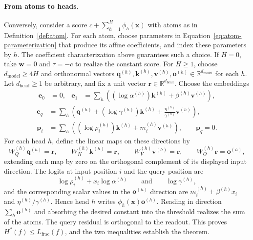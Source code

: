 \documentclass{article}
\theoremstyle{definition}
\theoremstyle{plain}
\newcommand{\hstar}{H^{\ast}}
\begin{document}
\paragraph{From atoms to heads.}
Conversely, consider a score $c+\sum_{h=1}^{H}\phi_h(\mathbf{x})$ with atoms as in Definition~\ref{def:atom}. For each atom, choose parameters in Equation~\eqref{eq:atom-parameterization} that produce its affine coefficients, and index these parameters by $h$. The coefficient characterization above guarantees such a choice. If $H=0$, take $\mathbf{w}=0$ and $\tau=-c$ to realize the constant score. For $H\geq1$, choose $d_{\mathrm{model}}\geq4H$ and orthonormal vectors $\mathbf{q}^{(h)},\mathbf{k}^{(h)},\mathbf{v}^{(h)},\mathbf{o}^{(h)}\in\mathbb{R}^{d_{\mathrm{model}}}$ for each $h$. Let $d_{\mathrm{head}}\geq1$ be arbitrary, and fix a unit vector $\mathbf{r}\in\mathbb{R}^{d_{\mathrm{head}}}$. Choose the embeddings
\begin{align}
\mathbf{e}_0&=0,
&
\mathbf{e}_1&=\sum_h\left((\log\alpha^{(h)})\mathbf{k}^{(h)}
+\beta^{(h)}\mathbf{v}^{(h)}\right),
\label{eq:normal-token-embeddings}
\end{align}
\begin{equation}
\begin{aligned}
\mathbf{e}_q&=\sum_h\left(\mathbf{q}^{(h)}
+(\log\gamma^{(h)})\mathbf{k}^{(h)}
+\frac{\eta^{(h)}}{\gamma^{(h)}}\mathbf{v}^{(h)}\right),
\\
\mathbf{p}_i&=\sum_h\left((\log\rho_i^{(h)})\mathbf{k}^{(h)}
+m_i^{(h)}\mathbf{v}^{(h)}\right),
\qquad \mathbf{p}_q=0.
\end{aligned}
\label{eq:normal-position-embeddings}
\end{equation}
For each head $h$, define the linear maps on these directions by
\begin{equation}
W_Q^{(h)}\mathbf{q}^{(h)}=\mathbf{r},
\qquad
W_K^{(h)}\mathbf{k}^{(h)}=\mathbf{r},
\qquad
W_V^{(h)}\mathbf{v}^{(h)}=\mathbf{r},
\qquad
W_O^{(h)}\mathbf{r}=\mathbf{o}^{(h)},
\label{eq:normal-projection-construction}
\end{equation}
extending each map by zero on the orthogonal complement of its displayed input direction. The logits at input position $i$ and the query position are
\begin{equation}
\log\rho_i^{(h)}+x_i\log\alpha^{(h)}
\qquad\text{and}\qquad
\log\gamma^{(h)},
\end{equation}
and the corresponding scalar values in the $\mathbf{o}^{(h)}$ direction are $m_i^{(h)}+\beta^{(h)}x_i$ and $\eta^{(h)}/\gamma^{(h)}$. Hence head $h$ writes $\phi_h(\mathbf{x})\mathbf{o}^{(h)}$. Reading in direction $\sum_h\mathbf{o}^{(h)}$ and absorbing the desired constant into the threshold realizes the sum of the atoms. The query residual is orthogonal to the readout. This proves $\hstar(f)\leq L_{\mathrm{frac}}(f)$, and the two inequalities establish the theorem.
\end{document}
